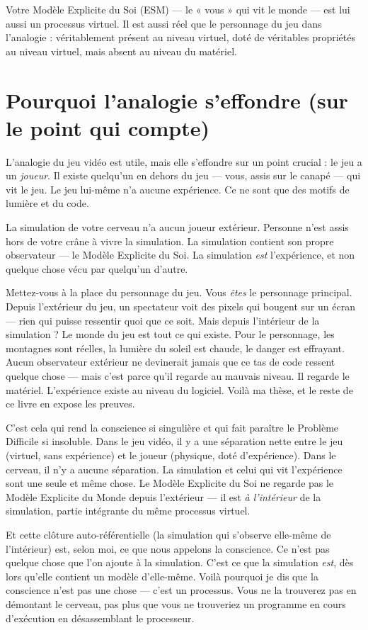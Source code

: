 \documentclass[11pt, twoside, openright]{book}
\begin{document}
Votre Modèle Explicite du Soi (ESM) --- le « vous » qui vit le monde --- est lui aussi un processus virtuel. Il est aussi réel que le personnage du jeu dans l'analogie : véritablement présent au niveau virtuel, doté de véritables propriétés au niveau virtuel, mais absent au niveau du matériel.

\section*{Pourquoi l'analogie s'effondre (sur le point qui compte)}

L'analogie du jeu vidéo est utile, mais elle s'effondre sur un point crucial : le jeu a un \textit{joueur}. Il existe quelqu'un en dehors du jeu --- vous, assis sur le canapé --- qui vit le jeu. Le jeu lui-même n'a aucune expérience. Ce ne sont que des motifs de lumière et du code.

La simulation de votre cerveau n'a aucun joueur extérieur. Personne n'est assis hors de votre crâne à vivre la simulation. La simulation contient son propre observateur --- le Modèle Explicite du Soi. La simulation \textit{est} l'expérience, et non quelque chose vécu par quelqu'un d'autre.

Mettez-vous à la place du personnage du jeu. Vous \textit{êtes} le personnage principal. Depuis l'extérieur du jeu, un spectateur voit des pixels qui bougent sur un écran --- rien qui puisse ressentir quoi que ce soit. Mais depuis l'intérieur de la simulation ? Le monde du jeu est tout ce qui existe. Pour le personnage, les montagnes sont réelles, la lumière du soleil est chaude, le danger est effrayant. Aucun observateur extérieur ne devinerait jamais que ce tas de code ressent quelque chose --- mais c'est parce qu'il regarde au mauvais niveau. Il regarde le matériel. L'expérience existe au niveau du logiciel. Voilà ma thèse, et le reste de ce livre en expose les preuves.

C'est cela qui rend la conscience si singulière et qui fait paraître le Problème Difficile si insoluble. Dans le jeu vidéo, il y a une séparation nette entre le jeu (virtuel, sans expérience) et le joueur (physique, doté d'expérience). Dans le cerveau, il n'y a aucune séparation. La simulation et celui qui vit l'expérience sont une seule et même chose. Le Modèle Explicite du Soi ne regarde pas le Modèle Explicite du Monde depuis l'extérieur --- il est \textit{à l'intérieur} de la simulation, partie intégrante du même processus virtuel.

Et cette clôture auto-référentielle (la simulation qui s'observe elle-même de l'intérieur) est, selon moi, ce que nous appelons la conscience. Ce n'est pas quelque chose que l'on ajoute à la simulation. C'est ce que la simulation \textit{est}, dès lors qu'elle contient un modèle d'elle-même. Voilà pourquoi je dis que la conscience n'est pas une chose --- c'est un processus. Vous ne la trouverez pas en démontant le cerveau, pas plus que vous ne trouveriez un programme en cours d'exécution en désassemblant le processeur.
\end{document}
